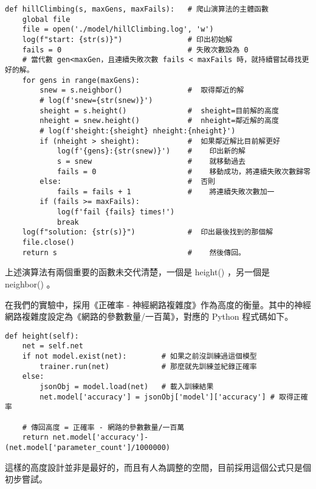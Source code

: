 \documentclass{article}
\begin{document}
\begin{minipage}{\linewidth}
\begin{lstlisting}
def hillClimbing(s, maxGens, maxFails):   # 爬山演算法的主體函數
    global file
    file = open('./model/hillClimbing.log', 'w')
    log(f"start: {str(s)}")               # 印出初始解
    fails = 0                             # 失敗次數設為 0
    # 當代數 gen<maxGen，且連續失敗次數 fails < maxFails 時，就持續嘗試尋找更好的解。
    for gens in range(maxGens):
        snew = s.neighbor()               #  取得鄰近的解
        # log(f'snew={str(snew)}')
        sheight = s.height()              #  sheight=目前解的高度
        nheight = snew.height()           #  nheight=鄰近解的高度
        # log(f'sheight:{sheight} nheight:{nheight}')
        if (nheight > sheight):           #  如果鄰近解比目前解更好
            log(f'{gens}:{str(snew)}')    #    印出新的解
            s = snew                      #    就移動過去
            fails = 0                     #    移動成功，將連續失敗次數歸零
        else:                             #  否則
            fails = fails + 1             #    將連續失敗次數加一
        if (fails >= maxFails):
            log(f'fail {fails} times!')
            break
    log(f"solution: {str(s)}")            #  印出最後找到的那個解
    file.close()
    return s                              #    然後傳回。
\end{lstlisting}
\end{minipage}

上述演算法有兩個重要的函數未交代清楚，一個是 height() ，另一個是 neighbor() 。

在我們的實驗中，採用《正確率 - 神經網路複雜度》作為高度的衡量。其中的神經網路複雜度設定為《網路的參數數量/一百萬》，對應的 Python 程式碼如下。

\begin{minipage}{\linewidth}
\begin{lstlisting}
def height(self):
    net = self.net
    if not model.exist(net):        # 如果之前沒訓練過這個模型
        trainer.run(net)            # 那麼就先訓練並紀錄正確率
    else:
        jsonObj = model.load(net)   # 載入訓練結果
        net.model['accuracy'] = jsonObj['model']['accuracy'] # 取得正確率

    # 傳回高度 = 正確率 - 網路的參數數量/一百萬
    return net.model['accuracy']-(net.model['parameter_count']/1000000)
\end{lstlisting}
\end{minipage}

這樣的高度設計並非是最好的，而且有人為調整的空間，目前採用這個公式只是個初步嘗試。
\end{document}
